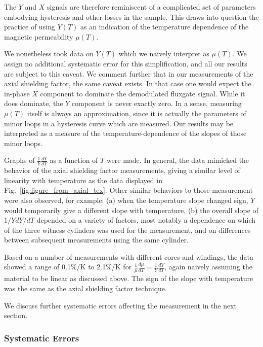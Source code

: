 The $Y$ and $X$ signals are therefore reminiscent of a complicated set
of parameters embodying hysteresis and other losses in the sample.
This draws into question the practice of using $Y(T)$ as an indication
of the temperature dependence of the magnetic permeability $\mu(T)$.

We nonetheless took data on $Y(T)$ which we naively interpret as
$\mu(T)$.  We assign no additional systematic error for this
simplification, and all our results are subject to this caveat.  We
comment further that in our measurements of the axial shielding
factor, the same caveat exists.  In that case one would expect the
in-phase $X$ component to dominate the demodulated fluxgate signal.
While it does dominate, the $Y$ component is never exactly zero.  In a
sense, measuring $\mu(T)$ itself is always an approximation, since it
is actually the parameters of minor loops in a hysteresis curve which
are measured.  Our results may be interpreted as a measure of the
temperature-dependence of the slopes of those minor loops.

Graphs of $\frac{1}{Y}\frac{dY}{dT}$ as a function of $T$ were made.
In general, the data mimicked the behavior of the axial shielding
factor measurements, giving a similar level of linearity with
temperature as the data displayed in
Fig.~\ref{fig:figure_from_axial_tex}.  Other similar behaviors to
those measurement were also observed, for example: (a) when the
temperature slope changed sign, $Y$ would temporarily give a different
slope with temperature, (b) the overall slope of $1/Y dY/dT$ depended
on a variety of factors, most notably a dependence on which of the
three witness cylinders was used for the measurement, and on
differences between subsequent measurements using the same cylinder.

Based on a number of measurements with different cores and windings,
the data showed a range of 0.1\%/K to 2.1\%/K for
$\frac{1}{\mu}\frac{d\mu}{dT}=\frac{1}{Y}\frac{dY}{dT}$, again naively
assuming the material to be linear as discussed above.  The sign of
the slope with temperature was the same as the axial shielding factor
technique.

We discuss further systematic errors affecting the measurement in the
next section.

\subsubsection{Systematic Errors}

%

